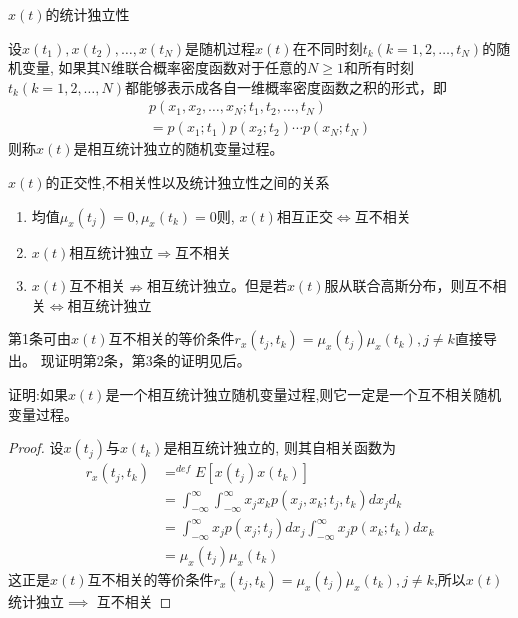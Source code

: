 \begin{frame}{$x(t)$的统计独立性}
\begin{definition}[]
设$x(t_1),x(t_2),\dots,x(t_N)$是随机过程$x(t)$在不同时刻$t_k(k=1,2,\dots,t_N)$的随机变量, 如果其N维联合概率密度函数对于任意的$N\ge 1$和所有时刻$t_k(k=1,2,\dots,N)$都能够表示成各自一维概率密度函数之积的形式，即
\begin{align*}
p(x_1,x_2,\dots,x_N; t_1,t_2,\dots,t_N)\\
=p(x_1;t_1)p(x_2;t_2)\cdots p(x_N;t_N)
\end{align*}
则称$x(t)$是相互统计独立的随机变量过程。
\end{definition}
\end{frame}

\begin{frame}{$x(t)$的正交性,不相关性以及统计独立性之间的关系}
\begin{enumerate}
\item 均值$\mu_x(t_j)=0,\mu_x(t_k)=0$则, $x(t)$相互正交$\Leftrightarrow$互不相关\\
\item $x(t)$相互统计独立$\Rightarrow$互不相关
\item $x(t)$互不相关$\nRightarrow$相互统计独立。但是若$x(t)$服从联合高斯分布，则互不相关$\Leftrightarrow$相互统计独立
\end{enumerate}
第1条可由$x(t)$互不相关的等价条件$r_x(t_j,t_k)=\mu_x(t_j)\mu_x(t_k),j\ne k $直接导出。
现证明第2条，第3条的证明见后。
\end{frame}

\begin{frame}
证明:如果$x(t)$是一个相互统计独立随机变量过程,则它一定是一个互不相关随机变量过程。
\begin{proof}%
	设$x(t_j)$与$x(t_k)$是相互统计独立的, 则其自相关函数为
	\begin{align*}
	r_x(t_j,t_k)&\mathop{=}^{def}E[x(t_j)x(t_k)]\\
	&=\int_{-\infty}^{\infty}\int_{-\infty}^{\infty}x_jx_kp(x_j,x_k;t_j,t_k)dx_jd_k\\
	&=\int_{-\infty}^{\infty}x_jp(x_j;t_j)dx_j\int_{-\infty}^{\infty}x_jp(x_k;t_k)dx_k\\
	&=\mu_x(t_j)\mu_x(t_k)
	\end{align*}
	这正是$x(t)$互不相关的等价条件$r_x(t_j,t_k)=\mu_x(t_j)\mu_x(t_k),j\ne k $,所以$x(t)$统计独立$\implies$ 互不相关
\end{proof}
\end{frame}

